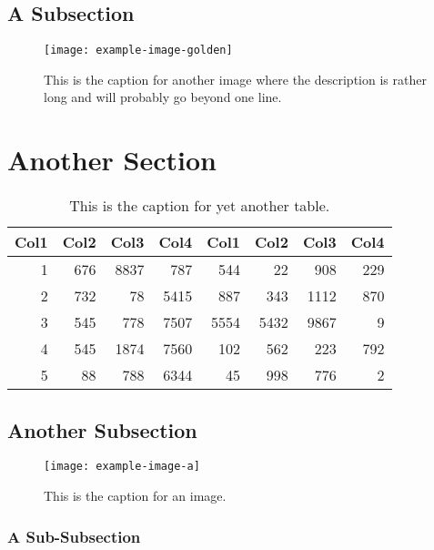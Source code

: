 \subsection{A Subsection}
    \lipsum[6-8]
    \begin{figure}
        \texttt{[image: example-image-golden]}
        \caption{This is the caption for another image where the description is rather long and will probably go beyond one line.}
    \end{figure}

\section{Another Section}
    \lipsum[1-2]
    \begin{table}
        \begin{tabular}{r r r r r r r r}
             Col1 & Col2 & Col3 & Col4 & Col1 & Col2 & Col3 & Col4 \\
             \hline
             1    & 676  & 8837 & 787  & 544  & 22   & 908  & 229  \\
             2    & 732  & 78   & 5415 & 887  & 343  & 1112 & 870  \\
             3    & 545  & 778  & 7507 & 5554 & 5432 & 9867 & 9    \\
             4    & 545  & 1874 & 7560 & 102  & 562  & 223  & 792  \\
             5    & 88   & 788  & 6344 & 45   & 998  & 776  & 2    \\
             \hline
        \end{tabular}
        \caption{This is the caption for yet another table.}
    \end{table}

\subsection{Another Subsection}
    \lipsum[3-5]
    \begin{figure}
        \texttt{[image: example-image-a]}
        \caption{This is the caption for an image.}
    \end{figure}

\subsubsection{A Sub-Subsection}
    \lipsum[6-8]

